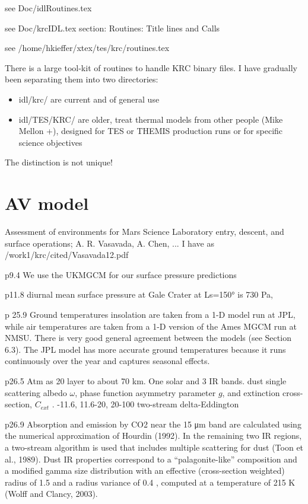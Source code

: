 \documentclass{article}
\begin{document}
see  Doc/idlRoutines.tex   

see  Doc/krcIDL.tex  section:  Routines: Title lines and  Calls

see /home/hkieffer/xtex/tes/krc/routines.tex

There is a large tool-kit of routines to handle KRC binary files. I have gradually been separating them into two directories:
\begin{itemize}      %
 \item  idl/krc/ are current and of general use 
\item   idl/TES/KRC/ are older, treat thermal models from other people (Mike Mellon +), designed for TES or THEMIS production runs or for specific science objectives 
\end{itemize}

The distinction is not unique! 

\section{AV model  \label{AVM} }
Assessment of environments for Mars Science Laboratory entry, descent, and surface operations; A. R. Vasavada, A. Chen, ...   
\qii I have as /work1/krc/cited/Vasavada12.pdf

p9.4 We use the UKMGCM for our surface pressure predictions 

p11.8 diurnal mean surface pressure at Gale Crater at Ls=150° is 730 Pa, 

p 25.9 Ground temperatures insolation are taken from a 1-D model run at JPL,
while air temperatures are taken from a 1-D version of the Ames MGCM run at
NMSU.  There is very good general agreement between the models (see Section
6.3).  The JPL model has more accurate ground temperatures because it runs
continuously over the year and captures seasonal effects.

p26.5 Atm as 20 layer to about 70 km. One solar and 3 IR bands.  \qi dust single
scattering albedo $\omega$, phase function asymmetry parameter $g$, and
extinction cross-section, $C_{ext}$ .
-11.6, 11.6-20, 20-100 \um two-stream delta-Eddington

p26.9 Absorption and emission by CO2 near the 15 \um μm band are calculated
using the numerical approximation of Hourdin (1992).  In the remaining two IR
regions, a two-stream algorithm is used that includes multiple scattering for
dust (Toon et al., 1989).  Dust IR properties correspond to a “palagonite-like”
composition and a modified gamma size distribution with an effective
(cross-section weighted) radius of 1.5 \um and a radius variance of 0.4 \um,
computed at a temperature of 215 K (Wolff and Clancy, 2003).
\end{document}
